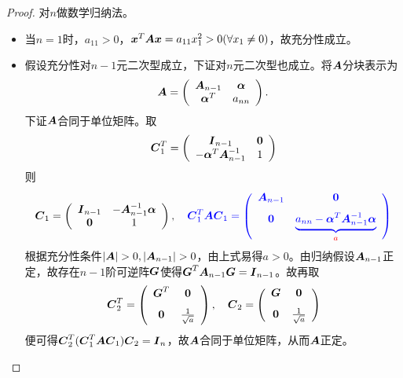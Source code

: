 \begin{frame}
  \begin{proof}
    \blue{($\Leftarrow$)~~} 对$n$做数学归纳法。 \pause 
    \begin{itemize}
    \item 当$n=1$时，$a_{11}>0$，${\boldsymbol{x}}^T\boldsymbol{A}{\boldsymbol{x}}=a_{11}x_1^2>0(\forall x_1\ne 0)$，故充分性成立。\\[0.1in] \pause 

    \item 假设充分性对$n-1$元二次型成立，下证对$n$元二次型也成立。将$\boldsymbol{A}$分块表示为
      $$
      \boldsymbol{A}=\left(
        \begin{array}{cc}
          \boldsymbol{A}_{n-1}&\boldsymbol{\alpha}\\
          \boldsymbol{\alpha}^T&a_{nn}
        \end{array}
      \right).
      $$
      下证$\boldsymbol{A}$合同于单位矩阵。\pause 取
      $$
      \MC_1^T=\left(
        \begin{array}{cc}
          \MI_{n-1}&\M0\\
          -\alphabd^T\MA_{n-1}^{-1}&1
        \end{array}
      \right)
      $$则
      $$
      \MC_1=\left(
        \begin{array}{cc}
          \MI_{n-1}&-\MA_{n-1}^{-1}\alphabd\\
          \M0&1
        \end{array}
      \right), \quad \blue{
        \MC_1^T\MA\MC_1=\left(
        \begin{array}{cc}
          \MA_{n-1}&\M0\\[.1in]
          \M0&\underbrace{a_{nn}-\alphabd^T\MA_{n-1}^{-1}\alphabd}_{\red{a}}
        \end{array}
      \right)
      }
      $$\pause 
      根据充分性条件$|\MA|>0,|\MA_{n-1}|>0$，由上式易得$a>0$。由归纳假设$\boldsymbol{A}_{n-1}$正定，故存在$n-1$阶可逆阵$\boldsymbol{G}$使得$\boldsymbol{G}^T\boldsymbol{A}_{n-1}\boldsymbol{G}=\boldsymbol{I}_{n-1}$。故再取
      $$
      \MC_2^T=\left(
        \begin{array}{cc}
          \MG^T&\M0\\[.1in]
          \M0&\frac1{\sqrt a}
        \end{array}
      \right),\quad \MC_2=\left(
        \begin{array}{cc}
          \MG&\M0\\[.1in]
          \M0&\frac1{\sqrt a}
        \end{array}
      \right)
      $$
      便可得$\boldsymbol{C}_2^T(\boldsymbol{C}_1^T\boldsymbol{A}\boldsymbol{C}_1)\boldsymbol{C}_2=\boldsymbol{I}_n$，故$\boldsymbol{A}$合同于单位矩阵，从而$\boldsymbol{A}$正定。
    \end{itemize}
  \end{proof}
\end{frame}

